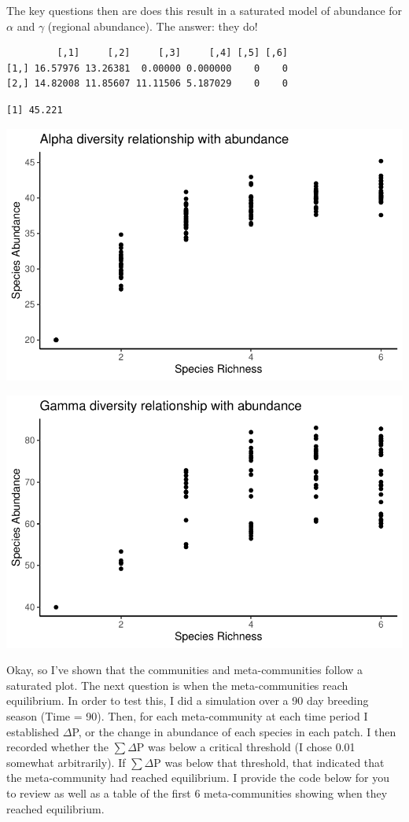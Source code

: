 \documentclass[
  letterpaper,
  DIV=11,
  numbers=noendperiod]{scrartcl}
\begin{document}
The key questions then are does this result in a saturated model of
abundance for \(\alpha\) and \(\gamma\) (regional abundance). The
answer: they do!

\begin{verbatim}
         [,1]     [,2]     [,3]     [,4] [,5] [,6]
[1,] 16.57976 13.26381  0.00000 0.000000    0    0
[2,] 14.82008 11.85607 11.11506 5.187029    0    0
\end{verbatim}

\begin{verbatim}
[1] 45.221
\end{verbatim}

\includegraphics{Report04.04.2024_files/figure-pdf/alpha plot-1.pdf}

\includegraphics{Report04.04.2024_files/figure-pdf/gamma plot-1.pdf}

Okay, so I've shown that the communities and meta-communities follow a
saturated plot. The next question is when the meta-communities reach
equilibrium. In order to test this, I did a simulation over a 90 day
breeding season (Time = 90). Then, for each meta-community at each time
period I established \(\Delta\)P, or the change in abundance of each
species in each patch. I then recorded whether the \(\sum \Delta\)P was
below a critical threshold (I chose 0.01 somewhat arbitrarily). If
\(\sum \Delta\)P was below that threshold, that indicated that the
meta-community had reached equilibrium. I provide the code below for you
to review as well as a table of the first 6 meta-communities showing
when they reached equilibrium.
\end{document}
